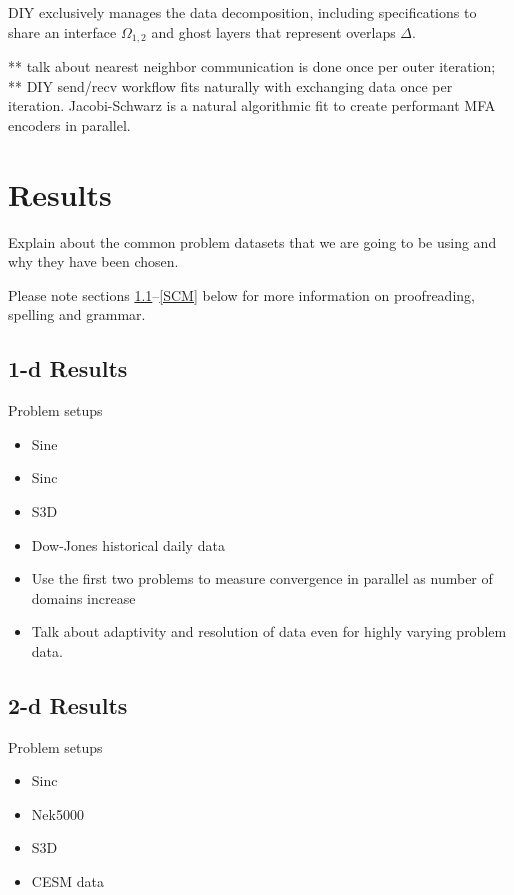 \documentclass[conference]{IEEEtran}
\begin{document}
{\color{red}
DIY exclusively manages the data decomposition, including specifications to share an interface $\Omega_{1,2}$ and ghost layers that represent overlaps $\Delta$.

** talk about nearest neighbor communication is done once per outer iteration; 
** DIY send/recv workflow fits naturally with exchanging data once per iteration. Jacobi-Schwarz is a natural algorithmic fit to create performant MFA encoders in parallel.
}


\section{Results}

Explain about the common problem datasets that we are going to be using and why they have been chosen.

Please note sections \ref{AA}--\ref{SCM} below for more information on 
proofreading, spelling and grammar.

\subsection{1-d Results}\label{AA}

Problem setups
\begin{itemize}
  \item Sine
  \item Sinc
  \item S3D
  \item Dow-Jones historical daily data
\end{itemize}

\begin{itemize}
	\item Use the first two problems to measure convergence in parallel as number of domains increase
	\item Talk about adaptivity and resolution of data even for highly varying problem data.
\end{itemize}

\subsection{2-d Results}

Problem setups
\begin{itemize}
	\item Sinc
	\item Nek5000
	\item S3D
	\item CESM data
\end{itemize}
\end{document}
